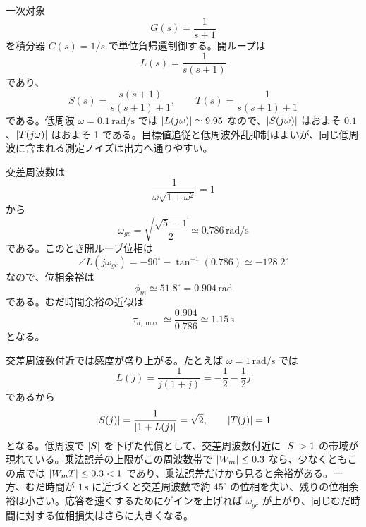 \begin{example}[一次対象の感度とむだ時間余裕]
一次対象
\begin{equation}
  G(s)=\frac{1}{s+1}
\end{equation}
を積分器 $C(s)=1/s$ で単位負帰還制御する。開ループは
\begin{equation}
  L(s)=\frac{1}{s(s+1)}
\end{equation}
であり、
\begin{equation}
  S(s)=\frac{s(s+1)}{s(s+1)+1},
  \qquad
  T(s)=\frac{1}{s(s+1)+1}
\end{equation}
である。低周波 $\omega=0.1\,\mathrm{rad/s}$ では $\left|L(j\omega)\right|\simeq9.95$ なので、$\left|S(j\omega)\right|$ はおよそ $0.1$、$\left|T(j\omega)\right|$ はおよそ 1 である。目標値追従と低周波外乱抑制はよいが、同じ低周波に含まれる測定ノイズは出力へ通りやすい。

交差周波数は
\begin{equation}
  \frac{1}{\omega\sqrt{1+\omega^2}}=1
\end{equation}
から
\begin{equation}
  \omega_{gc}
  =\sqrt{\frac{\sqrt{5}-1}{2}}
  \simeq0.786\,\mathrm{rad/s}
\end{equation}
である。このとき開ループ位相は
\begin{equation}
  \angle L(j\omega_{gc})
  =-90^\circ-\tan^{-1}(0.786)
  \simeq-128.2^\circ
\end{equation}
なので、位相余裕は
\begin{equation}
  \phi_m\simeq51.8^\circ
  =0.904\,\mathrm{rad}
\end{equation}
である。むだ時間余裕の近似は
\begin{equation}
  \tau_{d,\max}\simeq\frac{0.904}{0.786}
  \simeq1.15\,\mathrm{s}
\end{equation}
となる。

交差周波数付近では感度が盛り上がる。たとえば $\omega=1\,\mathrm{rad/s}$ では
\begin{equation}
  L(j)=\frac{1}{j(1+j)}=-\frac{1}{2}-\frac{1}{2}j
\end{equation}
であるから
\begin{equation}
  \left|S(j)\right|
  =\frac{1}{\left|1+L(j)\right|}
  =\sqrt{2},\qquad
  \left|T(j)\right|=1
\end{equation}
となる。低周波で $\left|S\right|$ を下げた代償として、交差周波数付近に $\abs{S}>1$ の帯域が現れている。乗法誤差の上限がこの周波数帯で $\left|W_m\right|\le0.3$ なら、少なくともこの点では $\left|W_mT\right|\le0.3<1$ であり、乗法誤差だけから見ると余裕がある。一方、むだ時間が $1\,\mathrm{s}$ に近づくと交差周波数で約 $45^\circ$ の位相を失い、残りの位相余裕は小さい。応答を速くするためにゲインを上げれば $\omega_{gc}$ が上がり、同じむだ時間に対する位相損失はさらに大きくなる。
\end{example}
